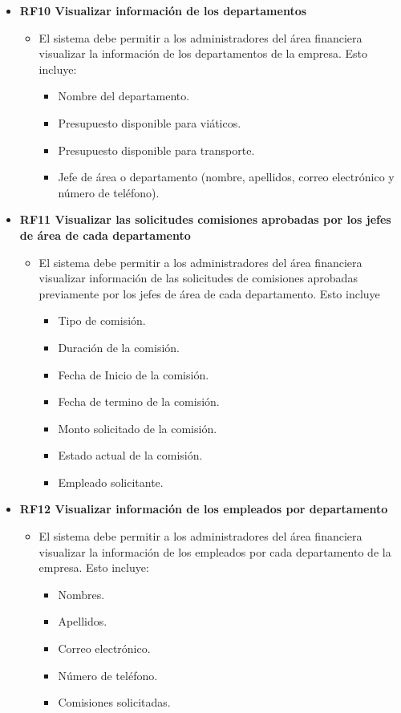 \begin{itemize}

	\item \textbf{RF10 Visualizar información de los departamentos}
	\begin{itemize}
		\item El sistema debe permitir a los administradores del área financiera visualizar la información de los departamentos de la empresa. Esto incluye:
		\begin{itemize}
			\item Nombre del departamento.
			\item Presupuesto disponible para viáticos.
			\item Presupuesto disponible para transporte.
			\item Jefe de área o departamento (nombre, apellidos, correo electrónico y número de teléfono).
		\end{itemize}
	\end{itemize}


	\item \textbf{RF11 Visualizar las solicitudes comisiones aprobadas por los jefes de área de cada departamento}
	\begin{itemize}
		\item El sistema debe permitir a los administradores del área financiera visualizar información de las solicitudes de comisiones aprobadas previamente por los jefes de área de cada departamento. Esto incluye
		\begin{itemize}
			\item Tipo de comisión.
			\item Duración de la comisión.
			\item Fecha de Inicio de la comisión.
			\item Fecha de termino de la comisión.
			\item Monto solicitado de la comisión.
			\item Estado actual de la comisión.
			\item Empleado solicitante.
		\end{itemize}
	\end{itemize}

	\item \textbf{RF12 Visualizar información de los empleados por departamento}
	\begin{itemize}
		\item El sistema debe permitir a los administradores del área financiera visualizar la información de los empleados por cada departamento de la empresa. Esto incluye:
		\begin{itemize}
			\item Nombres.
			\item Apellidos.
			\item Correo electrónico.
			\item Número de teléfono.
			\item Comisiones solicitadas.
		\end{itemize}
	\end{itemize}
	

\end{itemize}
